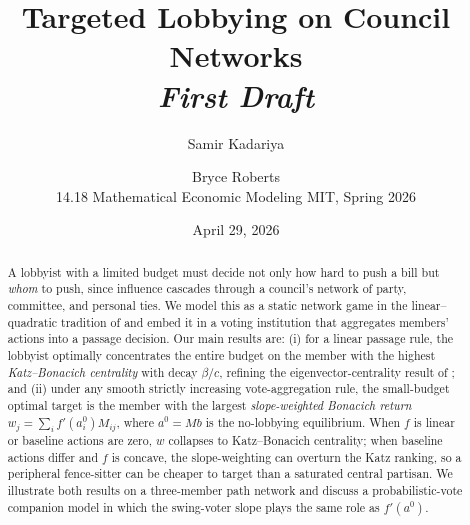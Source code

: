 \documentclass[11pt,letterpaper]{article}
\title{\bfseries Targeted Lobbying on Council Networks\\[0.4em]
{\large \emph{First Draft}}}
\author{Samir Kadariya \and Bryce Roberts\\[0.4em]
\small 14.18 Mathematical Economic Modeling \quad\textbar\quad MIT, Spring 2026}
\date{April 29, 2026}
\theoremstyle{plain}
\theoremstyle{definition}
\theoremstyle{remark}
\begin{document}
\maketitle

\begin{abstract}
\noindent A lobbyist with a limited budget must decide not only how hard to push a bill but \emph{whom} to push, since influence cascades through a council's network of party, committee, and personal ties. We model this as a static network game in the linear--quadratic tradition of \citet{ggg2020} and embed it in a voting institution that aggregates members' actions into a passage decision. Our main results are: (i) for a linear passage rule, the lobbyist optimally concentrates the entire budget on the member with the highest \emph{Katz--Bonacich centrality} with decay $\beta/c$, refining the eigenvector-centrality result of \citet{ggg2020}; and (ii) under any smooth strictly increasing vote-aggregation rule, the small-budget optimal target is the member with the largest \emph{slope-weighted Bonacich return} $w_j = \sum_i f'(a_i^0) M_{ij}$, where $a^0 = Mb$ is the no-lobbying equilibrium. When $f$ is linear or baseline actions are zero, $w$ collapses to Katz--Bonacich centrality; when baseline actions differ and $f$ is concave, the slope-weighting can overturn the Katz ranking, so a peripheral fence-sitter can be cheaper to target than a saturated central partisan. We illustrate both results on a three-member path network and discuss a probabilistic-vote companion model in which the swing-voter slope plays the same role as $f'(a^0)$.
\end{abstract}















\end{document}
